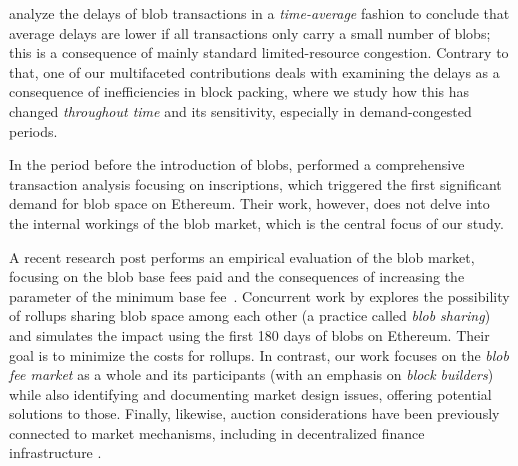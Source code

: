 \textcite{soltani2024delay} analyze the delays of blob transactions in a \emph{time-average} fashion to conclude that average delays are lower if all transactions only carry a small number of blobs; this is a consequence of mainly standard limited-resource congestion. Contrary to that, one of our multifaceted contributions deals with examining the delays as a consequence of inefficiencies in block packing, where we study how this has changed \emph{throughout time} and its sensitivity, especially in demand-congested periods.

In the period before the introduction of blobs, \textcite{messias2024writing} performed a comprehensive transaction analysis focusing on inscriptions, which triggered the first significant demand for blob space on Ethereum. Their work, however, does not delve into the internal workings of the blob market, which is the central focus of our study.

A recent research post performs an empirical evaluation of the blob market, focusing on the blob base fees paid and the consequences of increasing the parameter of the minimum base fee~\parencite{dataalways2024minimumblobfees}. Concurrent work by \textcite{lee2024180} explores the possibility of rollups sharing blob space among each other (a practice called \textit{blob sharing}) and simulates the impact using the first 180 days of blobs on Ethereum. Their goal is to minimize the costs for rollups. In contrast, our work focuses on the \emph{blob fee market} as a whole and its participants (with an emphasis on \emph{block builders}) while also identifying and documenting market design issues, offering potential solutions to those.
Finally, likewise, auction considerations have been previously connected to market mechanisms, including in decentralized finance infrastructure \parencite{myersonian_mm,complexity,nftauctions}.
